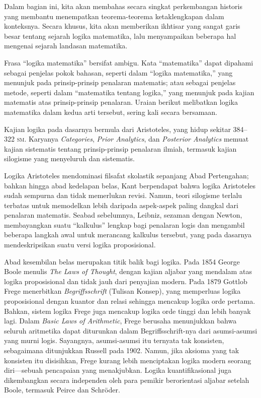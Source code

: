 \documentclass[../../../include/open-logic-section]{subfiles}
\begin{document}


Dalam bagian ini, kita akan membahas secara singkat perkembangan historis
yang membantu menempatkan teorema-teorema ketaklengkapan dalam konteksnya.
Secara khusus, kita akan memberikan ikhtisar yang sangat garis besar tentang
sejarah logika matematika, lalu menyampaikan beberapa hal mengenai sejarah
landasan matematika.

\begin{digress}
  Frasa ``logika matematika'' bersifat ambigu. Kata ``matematika'' dapat
  dipahami sebagai penjelas pokok bahasan, seperti dalam ``logika
  matematika,'' yang menunjuk pada prinsip-prinsip penalaran matematis; atau
  sebagai penjelas metode, seperti dalam ``matematika tentang logika,'' yang
  menunjuk pada kajian matematis atas prinsip-prinsip penalaran. Uraian
  berikut melibatkan logika matematika dalam kedua arti tersebut, sering kali
  secara bersamaan.
\end{digress}

Kajian logika pada dasarnya bermula dari Aristoteles, yang hidup sekitar
384--322 \textsc{sm}. Karyanya \emph{Categories}, \emph{Prior Analytics},
dan \emph{Posterior Analytics} memuat kajian sistematis tentang
prinsip-prinsip penalaran ilmiah, termasuk kajian silogisme yang menyeluruh
dan sistematis.

Logika Aristoteles mendominasi filsafat skolastik sepanjang Abad Pertengahan;
bahkan hingga abad kedelapan belas, Kant berpendapat bahwa logika Aristoteles
sudah sempurna dan tidak memerlukan revisi. Namun, teori silogisme terlalu
terbatas untuk memodelkan lebih daripada aspek-aspek paling dangkal dari
penalaran matematis. Seabad sebelumnya, Leibniz, sezaman dengan Newton,
membayangkan suatu ``kalkulus'' lengkap bagi penalaran logis dan mengambil
beberapa langkah awal untuk merancang kalkulus tersebut, yang pada dasarnya
mendeskripsikan suatu versi logika proposisional.

Abad kesembilan belas merupakan titik balik bagi logika. Pada 1854 George
Boole menulis \emph{The Laws of Thought}, dengan kajian aljabar yang mendalam
atas logika proposisional dan tidak jauh dari penyajian modern. Pada 1879
Gottlob Frege menerbitkan \emph{Begriffsschrift} (Tulisan Konsep), yang
memperluas logika proposisional dengan kuantor dan relasi sehingga mencakup
logika orde pertama. Bahkan, sistem logika Frege juga mencakup logika orde
tinggi dan lebih banyak lagi. Dalam \emph{Basic Laws of Arithmetic}, Frege
berusaha menunjukkan bahwa seluruh aritmetika dapat diturunkan dalam
Begriffsschrift-nya dari asumsi-asumsi yang murni logis. Sayangnya,
asumsi-asumsi itu ternyata tak konsisten, sebagaimana ditunjukkan Russell pada
1902. Namun, jika aksioma yang tak konsisten itu disisihkan, Frege kurang
lebih menciptakan logika modern seorang diri---sebuah pencapaian yang
menakjubkan. Logika kuantifikasional juga dikembangkan secara independen oleh
para pemikir berorientasi aljabar setelah Boole, termasuk Peirce dan
Schr\"oder.
\end{document}
